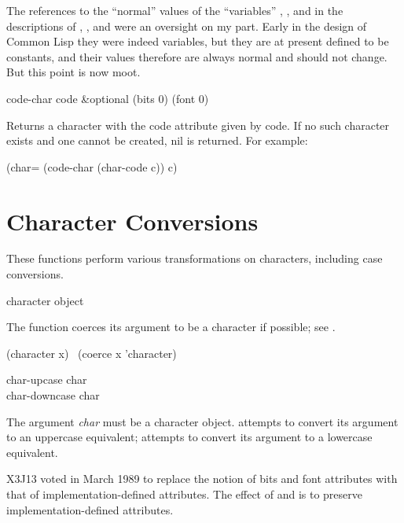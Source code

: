\medskip
\begin{new}
The references to the ``normal'' values of the ``variables''
,
, and  in the descriptions
of , , and  were an oversight on
my part.  Early in the design of Common Lisp they were indeed variables,
but they are at present defined to be constants, and their values therefore
are always normal and should not change.  But this point is now moot.
\end{new}

\begin{defun}[Function]
code-char code &optional (bits 0) (font 0)

Returns a character with the code attribute given by code. If no such character
exists and one cannot be created, nil is returned.
For example:

\begin{lisp}
(char= (code-char (char-code c)) c)
\end{lisp}
\end{defun}

\section{Character Conversions}

These functions perform various transformations on characters,
including case conversions.

\begin{defun}[Function]
character object

The function  coerces its argument to be a character
if possible; see .
\begin{lisp}
(character x) \EQ\ (coerce x 'character)
\end{lisp}
\end{defun}


\begin{defun}[Function]
char-upcase char \\
char-downcase char

The argument \emph{char} must be a character object.
 attempts to convert its argument to an uppercase
equivalent;  attempts to convert its argument
to a lowercase equivalent.

\begin{newer}
X3J13 voted in March 1989 
to replace the notion of bits and font attributes with
that of implementation-defined attributes.  The effect of
 and  is to preserve
implementation-defined attributes.
\end{newer}

\end{defun}

